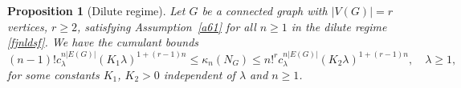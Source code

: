 \documentclass[12pt]{article}
\newtheorem{prop}{Proposition}[section]
\numberwithin{equation}{section}
\begin{document}
\begin{prop}[Dilute regime]
\label{t1}
Let $G$ be a connected graph with $|V(G)| = r$ vertices, $r\geq 2$, 
satisfying
Assumption~\ref{a61} for all $n\geq 1$
in the dilute regime \eqref{fjnldsf}. 
  We have the cumulant bounds 
\begin{equation}
\label{equiv-1}
 (n-1)! c_\lambda^{n |E(G)| } ( K_1 \lambda )^{1+(r-1)n}
 \leq 
 \kappa_n(N_G)
 \leq 
 n!^r c_\lambda^{n |E(G) |} ( K_2 \lambda )^{1+(r-1)n},
 \quad \lambda \geq 1, 
\end{equation}
for some constants $K_1$, $K_2>0$ independent of $\lambda$ and $n\geq 1$.
\end{prop} 
\end{document}
